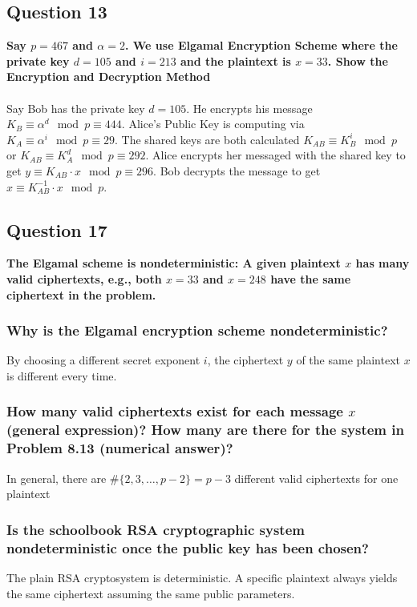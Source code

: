 \documentclass[titlepage]{article}
\begin{document}
{\subsection{Question 13}
{
\textbf{Say \(p = 467\) and \(\alpha = 2\). We use Elgamal Encryption Scheme where the private key \(d = 105\) and \(i = 213\) and the plaintext is \(x = 33\). Show the Encryption and Decryption Method}\\\\
Say Bob has the private key \(d = 105\). He encrypts his message \(K_B \equiv \alpha^d \mod p \equiv 444\). Alice's Public Key is computing via \(K_A \equiv \alpha^i \mod p \equiv 29\). The shared keys are both calculated \(K_{AB} \equiv K_B^i \mod p\) or \(K_{AB} \equiv K_A^d \mod p \equiv 292\). Alice encrypts her messaged with the shared key to get \(y \equiv K_{AB} \cdot x \mod p \equiv 296\). Bob decrypts the message to get \(x \equiv K_{AB}^{-1} \cdot x \mod p\). 
}
\subsection{Question 17}
{
\textbf{The Elgamal scheme is nondeterministic: A given plaintext \(x\) has many valid ciphertexts, e.g., both \(x = 33\) and \(x = 248\) have the same ciphertext in the problem.}
\subsubsection{Why is the Elgamal encryption scheme nondeterministic?}
{
By choosing a different secret exponent \(i\), the ciphertext \(y\) of the same plaintext \(x\) is different every time.
}
\subsubsection{How many valid ciphertexts exist for each message \(x\) (general expression)? How many are there for the system in Problem 8.13 (numerical answer)?}
{
In general, there are \(\#\{2,3, \dots, p - 2\} = p - 3\) different valid ciphertexts for one plaintext
}
\subsubsection{Is the schoolbook RSA cryptographic system nondeterministic once the public
key has been chosen?}
{
The plain RSA cryptosystem is deterministic. A specific plaintext always yields the same ciphertext assuming the same public parameters.
}
}
}
\end{document}
